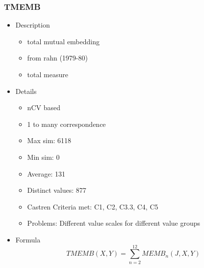 \documentclass{article}
\begin{document}
\subsubsection{TMEMB}
\label{sec-6-6-3}
\begin{itemize}

\item Description
\label{sec-6-6-3-1}%
\begin{itemize}
\item total mutual embedding
\item from rahn (1979-80)
\item total measure
\end{itemize}

\item Details
\label{sec-6-6-3-2}%
\begin{itemize}
\item nCV based
\item 1 to many correspondence
\item Max sim: 6118
\item Min sim: 0
\item Average: 131
\item Distinct values: 877
\item Castren Criteria met: C1, C2, C3.3, C4, C5
\item Problems: Different value scales for different value groups
\end{itemize}

\item Formula\\
\label{sec-6-6-3-3}%
$$ TMEMB\left(X,Y\right)=\sum_{n=2}^{12}MEMB_{n}\left(J,X,Y\right) $$
\end{itemize} %
\end{document}
